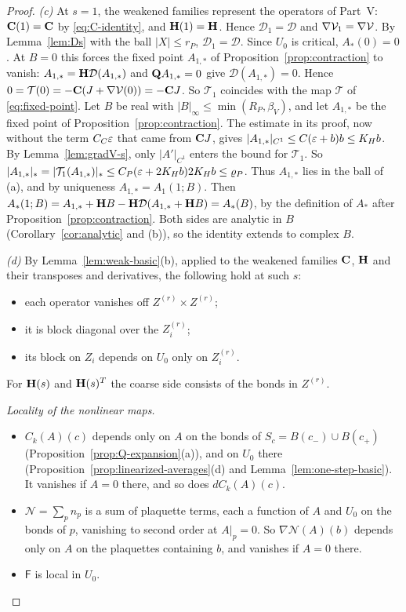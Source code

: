 \begin{proof}
\emph{(c)} At $s=1$, the weakened families represent the operators of Part~V: $\mathbf C(1)=\mathbf C$ by \eqref{eq:C-identity}, and $\mathbf H(1)=\mathbf H$. Hence $\mathcal D_1=\mathcal D$ and $\nabla\mathcal V_1=\nabla\mathcal V$. By Lemma~\ref{lem:Ds} with the ball $|X|\le r_P$, $\mathcal D_1=\mathcal D$. Since $U_0$ is critical, $A_*(0)=0$. At $B=0$ this forces the fixed point $A_{1,*}$ of Proposition~\ref{prop:contraction} to vanish: $A_{1,*}=\mathbf H\mathcal D(A_{1,*})$ and $\mathbf Q A_{1,*}=0$ give $\mathcal D(A_{1,*})=0$. Hence $0=\mathcal T(0)=-\mathbf C(J+\nabla\mathcal V(0))=-\mathbf C J$. So $\mathcal T_1$ coincides with the map $\mathcal T$ of \eqref{eq:fixed-point}. Let $B$ be real with $|B|_\infty\le\min(R_P,\beta_V)$, and let $A_{1,*}$ be the fixed point of Proposition~\ref{prop:contraction}. The estimate in its proof, now without the term $C_C\varepsilon$ that came from $\mathbf C J$, gives $|A_{1,*}|_{C^1}\le C(\varepsilon+b)b\le K_Hb$. By Lemma~\ref{lem:gradV-s}, only $|A'|_{C^1}$ enters the bound for $\mathcal T_1$. So $|A_{1,*}|_*=|\mathcal T_1(A_{1,*})|_*\le C_P(\varepsilon+2K_Hb)2K_Hb\le\varrho_P$. Thus $A_{1,*}$ lies in the ball of (a), and by uniqueness $A_{1,*}=A_1(1;B)$. Then $A_*(1;B)=A_{1,*}+\mathbf H B-\mathbf H\mathcal D(A_{1,*}+\mathbf H B)=A_*(B)$, by the definition of $A_*$ after Proposition~\ref{prop:contraction}. Both sides are analytic in $B$ (Corollary~\ref{cor:analytic} and (b)), so the identity extends to complex $B$.

\emph{(d)} By Lemma~\ref{lem:weak-basic}(b), applied to the weakened families $\mathbf C$, $\mathbf H$ and their transposes and derivatives, the following hold at such $s$:
\begin{itemize}
\item each operator vanishes off $Z^{(r)}\times Z^{(r)}$;
\item it is block diagonal over the $Z_i^{(r)}$;
\item its block on $Z_i$ depends on $U_0$ only on $Z_i^{(r)}$.
\end{itemize}
For $\mathbf H(s)$ and $\mathbf H(s)^T$ the coarse side consists of the bonds in $Z^{(r)}$.

\emph{Locality of the nonlinear maps.}
\begin{itemize}
\item $C_k(A)(c)$ depends only on $A$ on the bonds of $S_c=B(c_-)\cup B(c_+)$ (Proposition~\ref{prop:Q-expansion}(a)), and on $U_0$ there (Proposition~\ref{prop:linearized-averages}(d) and Lemma~\ref{lem:one-step-basic}). It vanishes if $A=0$ there, and so does $dC_k(A)(c)$.
\item $\mathcal N=\sum_pn_p$ is a sum of plaquette terms, each a function of $A$ and $U_0$ on the bonds of $p$, vanishing to second order at $A|_p=0$. So $\nabla\mathcal N(A)(b)$ depends only on $A$ on the plaquettes containing $b$, and vanishes if $A=0$ there.
\item $\mathsf F$ is local in $U_0$.
\end{itemize}


\end{proof}
